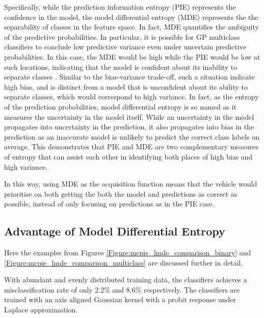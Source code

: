 			Specifically, while the prediction information entropy (PIE) represents the confidence in the model, the model differential entropy (MDE) represents the the separability of classes in the feature space. In fact, MDE quantifies the ambiguity of the predictive probabilities. In particular, it is possible for GP multiclass classifiers to conclude low predictive variance even under uncertain predictive probabilities. In this case, the MDE would be high while the PIE would be low at such locations, indicating that the model is confident about its inability to separate classes \citep{AsherBender}. Similar to the bias-variance trade-off, such a situation indicate high bias, and is distinct from a model that is unconfident about its ability to separate classes, which would correspond to high variance. In fact, as the entropy of the prediction probabilities, model differential entropy is so named as it measures the uncertainty in the model itself. While an uncertainty in the model propagates into uncertainty in the prediction, it also propagates into bias in the prediction as an inaccurate model is unlikely to predict the correct class labels on average. This demonstrates that PIE and MDE are two complementary measures of entropy that can assist each other in identifying both places of high bias and high variance.
			
			In this way, using MDE as the acquisition function means that the vehicle would prioritise on both getting the both the model and predictions as correct as possible, instead of only focusing on predictions as in the PIE case.
			
		\subsection{Advantage of Model Differential Entropy}
		\label{InformativeSeafloorExploration:ComparisonMutualEntropyMeasures:AdvantagesMDE}
		
			Here the examples from Figures \ref{Figure:mcpie_lmde_comparison_binary} and \ref{Figure:mcpie_lmde_comparison_multiclass} are discussed further in detail.
			
			With abundant and evenly distributed training data, the classifiers achieves a misclassification rate of only 2.2\% and 8.6\% respectively. The classifiers are trained with an axis aligned Gaussian kernel with a probit response under Laplace approximation. 
			
